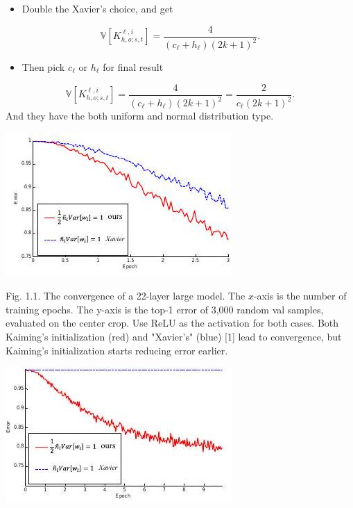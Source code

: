 \documentclass[10pt]{article}
\begin{document}
    \begin{itemize}
      \item Double the Xavier's choice, and get
    \end{itemize}
$$
\mathbb{V}\left[K_{h, o ; s, t}^{\ell, i}\right]=\frac{4}{\left(c_{\ell}+h_{\ell}\right)(2 k+1)^{2}} .
$$

    \begin{itemize}
      \item Then pick $c_{\ell}$ or $h_{\ell}$ for final result
    \end{itemize}
$$
\mathbb{V}\left[K_{h, o ; s, t}^{\ell, i}\right]=\frac{4}{\left(c_{\ell}+h_{\ell}\right)(2 k+1)^{2}}=\frac{2}{c_{\ell}(2 k+1)^{2}} .
$$
And they have the both uniform and normal distribution type.

\includegraphics[max width=\textwidth]{2022_01_06_7122b544778bcd520335g-09}

Fig. 1.1. The convergence of a 22-layer large model. The $x$-axis is the number of training epochs. The y-axis is the top-1 error of 3,000 random val samples, evaluated on the center crop. Use ReLU as the activation for both cases. Both Kaiming's initialization (red) and "Xavier's" (blue) [1] lead to convergence, but Kaiming's initialization starts reducing error earlier.

\includegraphics[max width=\textwidth]{2022_01_06_7122b544778bcd520335g-09(1)}
\end{document}
